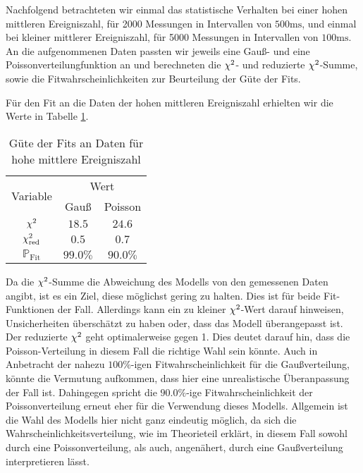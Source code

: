 Nachfolgend betrachteten wir einmal das statistische Verhalten bei einer hohen mittleren Ereigniszahl, für 2000 Messungen in Intervallen von $500\si{\milli\second}$, und einmal bei kleiner mittlerer Ereigniszahl, für 5000 Messungen in Intervallen von $100\si{\milli\second}$. An die aufgenommenen Daten passten wir jeweils eine Gauß- und eine Poissonverteilungfunktion an und berechneten die $\chi^{2}$- und reduzierte $\chi^{2}$-Summe, sowie die Fitwahrscheinlichkeiten zur Beurteilung der Güte der Fits.

Für den Fit an die Daten der hohen mittleren Ereigniszahl erhielten wir die Werte in Tabelle \ref{tab:fit_goodness_large}.

\renewcommand{\arraystretch}{1.3}
\begin{table}[H]
  \centering
  \begin{tabular}{c|c|c}
    \multirow{2}{*}{Variable} & \multicolumn{2}{c}{Wert}\\\cline{2-3}
    & Gauß & Poisson\\\hline
    $\chi^{2}$ & $18.5$ & $24.6$\\
    $\chi^{2}_{\mathrm{red}}$ & $0.5$ & $0.7$\\
    $\mathbb{P}_{\mathrm{Fit}}$ & $99.0 \%$ & $90.0\%$
  \end{tabular}
  \caption{Güte der Fits an Daten für hohe mittlere Ereigniszahl}
  \label{tab:fit_goodness_large}
\end{table}
\renewcommand{\arraystretch}{1}

Da die $\chi^{2}$-Summe die Abweichung des Modells von den gemessenen Daten angibt, ist es ein Ziel, diese möglichst gering zu halten. Dies ist für beide Fit-Funktionen der Fall. Allerdings kann ein zu kleiner $\chi^{2}$-Wert darauf hinweisen, Unsicherheiten überschätzt zu haben oder, dass das Modell überangepasst ist. Der reduzierte $\chi^{2}$ geht optimalerweise gegen 1. Dies deutet darauf hin, dass die Poisson-Verteilung in diesem Fall die richtige Wahl sein könnte. Auch in Anbetracht der nahezu $100\%$-igen Fitwahrscheinlichkeit für die Gaußverteilung, könnte die Vermutung aufkommen, dass hier eine unrealistische Überanpassung der Fall ist. Dahingegen spricht die $90.0\%$-ige Fitwahrscheinlichkeit der Poissonverteilung erneut eher für die Verwendung dieses Modells. Allgemein ist die Wahl des Modells hier nicht ganz eindeutig möglich, da sich die Wahrscheinlichkeitsverteilung, wie im Theorieteil erklärt, in diesem Fall sowohl durch eine Poissonverteilung, als auch, angenähert, durch eine Gaußverteilung interpretieren lässt.

